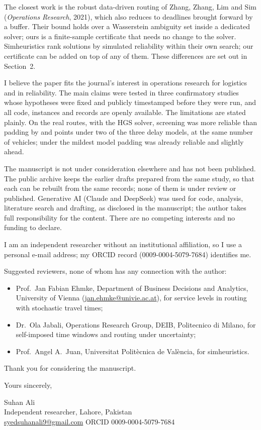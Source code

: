 \documentclass[11pt,a4paper]{article}
\begin{document}
The closest work is the robust data-driven routing of Zhang, Zhang, Lim and Sim
(\emph{Operations Research}, 2021), which also reduces to deadlines brought forward by a
buffer. Their bound holds over a Wasserstein ambiguity set inside a dedicated solver; ours
is a finite-sample certificate that needs no change to the solver. Simheuristics rank
solutions by simulated reliability within their own search; our certificate can be added
on top of any of them. These differences are set out in Section~2.

I believe the paper fits the journal's interest in operations research for logistics and
in reliability. The main claims were tested in three confirmatory studies whose hypotheses
were fixed and publicly timestamped before they were run, and all code, instances and
records are openly available. The limitations are stated plainly. On the real routes, with
the HGS solver, screening was more reliable than padding by \AmzHBothDiff{} and
\AmzHTBothDiff{} points under two of the three delay models, at the same number of
vehicles; under the mildest model padding was already reliable and slightly ahead.

The manuscript is not under consideration elsewhere and has not been published. The public
archive keeps the earlier drafts prepared from the same study, so that each can be rebuilt
from the same records; none of them is under review or published. Generative AI (Claude and DeepSeek) was used
for code, analysis, literature search and drafting, as disclosed in the manuscript; the author
takes full responsibility for the content. There are no competing interests and no funding to
declare.

I am an independent researcher without an institutional affiliation, so I use a personal
e-mail address; my ORCID record (0009-0004-5079-7684) identifies me.

Suggested reviewers, none of whom has any connection with the author:
\begin{itemize}
\item Prof.\ Jan Fabian Ehmke, Department of Business Decisions and Analytics, University of
Vienna (\href{mailto:jan.ehmke@univie.ac.at}{jan.ehmke@univie.ac.at}), for service levels in
routing with stochastic travel times;
\item Dr.\ Ola Jabali, Operations Research Group, DEIB, Politecnico di Milano, for
self-imposed time windows and routing under uncertainty;
\item Prof.\ Angel A.\ Juan, Universitat Polit\`ecnica de Val\`encia, for simheuristics.
\end{itemize}

Thank you for considering the manuscript.

Yours sincerely,

Suhan Ali\\
Independent researcher, Lahore, Pakistan\\
\href{mailto:syedsuhanali9@gmail.com}{syedsuhanali9@gmail.com} \quad ORCID 0009-0004-5079-7684
\end{document}
